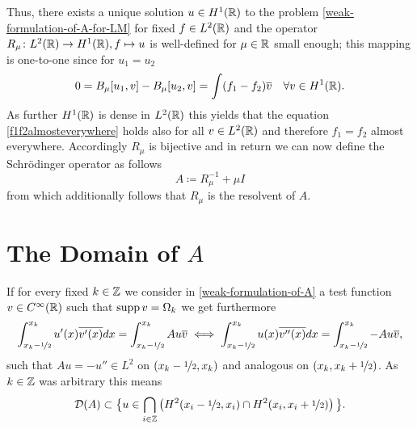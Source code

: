 Thus, there exists a unique solution $u \in H^{1}(\mathbb{R})$ to the problem \eqref{weak-formulation-of-A-for-LM} for fixed $f \in L^{2}(\mathbb{R})$ and  the operator $R_{\mu} \colon L^{2}(\mathbb{R}) \rightarrow H^{1}(\mathbb{R}), f \mapsto u$ is well-defined for $\mu \in \mathbb{R}$ small enough; this mapping is one-to-one since for $u_{1} = u_{2}$
	\begin{equation}
		0 = B_{\mu}[u_{1}, v] - B_{\mu}[u_{2}, v]= \int (f_{1} - f_{2}) \overline{v} \quad \forall v \in H^{1}(\mathbb{R}). \label{f1f2almosteverywhere}
	\end{equation} 
As further $H^{1}(\mathbb{R})$ is dense in $L^{2}(\mathbb{R})$ this yields that the equation \eqref{f1f2almosteverywhere} holds also for all $v \in L^{2}(\mathbb{R})$ and therefore $f_{1} = f_{2}$ almost everywhere. Accordingly $R_{\mu}$ is bijective and in return we can now define the Schrödinger operator as follows %
		\[ A \coloneqq R_{\mu}^{-1} + \mu I \]
from which additionally follows that $R_{\mu}$ is the resolvent of $A$.

\section{\texorpdfstring{The Domain of $A$}{The Domain of A}}
If for every fixed $k \in \mathbb{Z}$ we consider in \eqref{weak-formulation-of-A} a test function $v \in C^{\infty}(\mathbb{R})$ such that $\operatorname{supp} v = \Omega_{k}$ we get furthermore
	\[ \int_{x_{k}-\nicefrac{1}{2}}^{x_{k}} u'(x) \overline{v'(x)} dx = \int_{x_{k}-\nicefrac{1}{2}}^{x_{k}} A u \overline{v} \iff \int_{x_{k}-\nicefrac{1}{2}}^{x_{k}} u(x) \overline{v''(x)} dx = \int_{x_{k}-\nicefrac{1}{2}}^{x_{k}} - A u \overline{v}, \]
such that $A u = - u'' \in L^{2}$ on $(x_{k} -\nicefrac{1}{2}, x_{k})$ and analogous on $(x_{k}, x_{k} + \nicefrac{1}{2})$. %
As $k \in \mathbb{Z}$ was arbitrary this means 
	$$ \mathcal{D}(A) \subset \big\{ u \in \bigcap_{i \in \mathbb{Z}} \left( H^{2}(x_{i}-\nicefrac{1}{2}, x_{i}) \cap H^{2}(x_{i}, x_{i} + \nicefrac{1}{2}) \right) \big\}. $$
	
